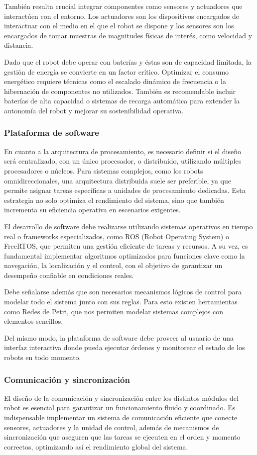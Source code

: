 También resulta crucial integrar componentes como sensores y actuadores que interactúen con el entorno. Los actuadores son los dispositivos encargados de interactuar con el medio en el que el robot se dispone y los sensores son los encargados de tomar muestras de magnitudes físicas de interés, como velocidad y distancia. \cite{lee2017introduction}

Dado que el robot debe operar con baterías y éstas son de capacidad limitada, la gestión de energía se convierte en un factor crítico. Optimizar el consumo energético requiere técnicas como el escalado dinámico de frecuencia o la hibernación de componentes no utilizados. También es recomendable incluir baterías de alta capacidad o sistemas de recarga automática para extender la autonomía del robot y mejorar su sostenibilidad operativa.


\subsubsection{Plataforma de software}
En cuanto a la arquitectura de procesamiento, es necesario definir si el diseño será centralizado, con un único procesador, o distribuido, utilizando múltiples procesadores o núcleos. Para sistemas complejos, como los robots omnidireccionales, una arquitectura distribuida suele ser preferible, ya que permite asignar tareas específicas a unidades de procesamiento dedicadas. Esta estrategia no solo optimiza el rendimiento del sistema, sino que también incrementa su eficiencia operativa en escenarios exigentes.

El desarrollo de software debe realizarse utilizando sistemas operativos en tiempo real o frameworks especializados, como ROS (Robot Operating System) o FreeRTOS, que permiten una gestión eficiente de tareas y recursos. A su vez, es fundamental implementar algoritmos optimizados para funciones clave como la navegación, la localización y el control, con el objetivo de garantizar un desempeño confiable en condiciones reales.

Debe señalarse además que son necesarios mecanismos lógicos de control para modelar todo el sistema junto con sus reglas. Para esto existen herramientas como Redes de Petri, que nos permiten modelar sistemas complejos con elementos sencillos.

Del mismo modo, la plataforma de software debe proveer al usuario de una interfaz interactiva donde pueda ejecutar órdenes y monitorear el estado de los robots en todo momento.


\subsubsection{Comunicación y sincronización}
El diseño de la comunicación y sincronización entre los distintos módulos del robot es esencial para garantizar un funcionamiento fluido y coordinado. Es indispensable implementar un sistema de comunicación eficiente que conecte sensores, actuadores y la unidad de control, además de mecanismos de sincronización que aseguren que las tareas se ejecuten en el orden y momento correctos, optimizando así el rendimiento global del sistema. \cite{lee2017introduction}

